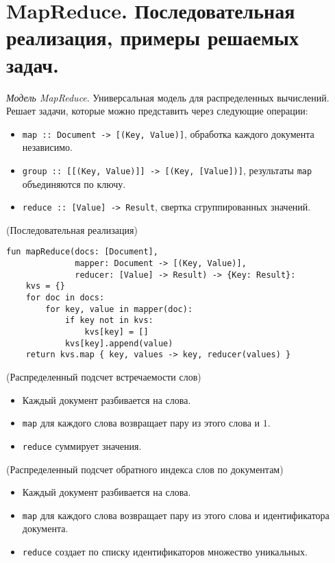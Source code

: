 \section{MapReduce. Последовательная реализация, примеры решаемых задач.}

\begin{definition}
    \textit{Модель MapReduce}. Универсальная модель для распределенных
    вычислений. Решает задачи, которые можно представить через следующие
    операции:
    \begin{itemize}
      \item \texttt{map :: Document -> [(Key, Value)]}, обработка каждого
        документа независимо.
      \item \texttt{group :: [[(Key, Value)]] -> [(Key, [Value])]},
        результаты \texttt{map} объединяются по ключу.
      \item \texttt{reduce :: [Value] -> Result}, свертка сгруппированных
        значений.
    \end{itemize}
\end{definition}


\begin{algorithm}(Последовательная реализация)
  \begin{lstlisting}
fun mapReduce(docs: [Document],
              mapper: Document -> [(Key, Value)],
              reducer: [Value] -> Result) -> {Key: Result}:
    kvs = {}
    for doc in docs:
        for key, value in mapper(doc):
            if key not in kvs:
                kvs[key] = []
            kvs[key].append(value)
    return kvs.map { key, values -> key, reducer(values) }
  \end{lstlisting}
\end{algorithm}

\begin{example}(Распределенный подсчет встречаемости слов)
  \begin{itemize}
    \item Каждый документ разбивается на слова.
    \item \texttt{map} для каждого слова возвращает пару из этого слова и $1$.
    \item \texttt{reduce} суммирует значения.
  \end{itemize}
\end{example}

\begin{example}(Распределенный подсчет обратного индекса слов по документам)
  \begin{itemize}
    \item Каждый документ разбивается на слова.
    \item \texttt{map} для каждого слова возвращает пару из этого слова и
      идентификатора документа.
    \item \texttt{reduce} создает по списку идентификаторов множество
      уникальных.
  \end{itemize}
\end{example}
